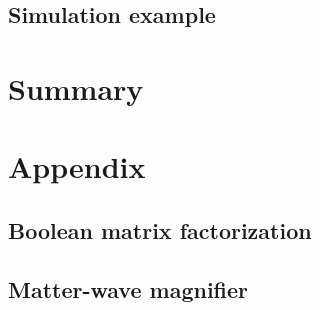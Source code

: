 \documentclass[twoside]{article}
\begin{document}
\subsection{Simulation example}



\newpage
\section{Summary} \label{sec:summary}



\newpage
\section{Appendix} \label{sec:appendix}

\subsection{Boolean matrix factorization} \label{subsec:bmfsat}


\subsection{Matter-wave magnifier} \label{sec:mwm}

%  



% 


\newpage


\end{document}
